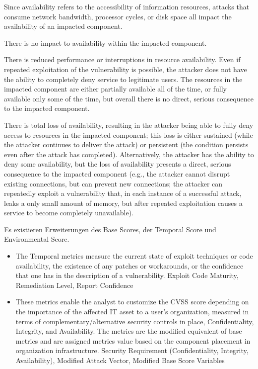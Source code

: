 \begin{description}[itemsep=1em,align=left]
            Since availability refers to the accessibility of information resources, attacks that consume network bandwidth, processor cycles, or disk space all impact the availability of an impacted component.
            \begin{description}[noitemsep,align=left]
                \item [None:] There is no impact to availability within the impacted component.
                \item [Low:] There is reduced performance or interruptions in resource availability. 
                    Even if repeated exploitation of the vulnerability is possible, the attacker does not have the ability to completely deny service to legitimate users. 
                    The resources in the impacted component are either partially available all of the time, or fully available only some of the time, but overall there is no direct, serious consequence to the impacted component.
                \item [High:] There is total loss of availability, resulting in the attacker being able to fully deny access to resources in the impacted component; this loss is either sustained (while the attacker continues to deliver the attack) or persistent (the condition persists even after the attack has completed). 
                    Alternatively, the attacker has the ability to deny some availability, but the loss of availability presents a direct, serious consequence to the impacted component (e.g., the attacker cannot disrupt existing connections, but can prevent new connections; the attacker can repeatedly exploit a vulnerability that, in each instance of a successful attack, leaks a only small amount of memory, but after repeated exploitation causes a service to become completely unavailable).
            \end{description}
    \end{description}
    
    Es existieren Erweiterungen des Base Scores, der Temporal Score und Environmental Score. 
    \begin{itemize}
        \item The Temporal metrics measure the current state of exploit techniques or code availability, the existence of any patches or workarounds, or the confidence that one has in the description of a vulnerability. 
            Exploit Code Maturity, Remediation Level, Report Confidence
        \item These metrics enable the analyst to customize the CVSS score depending on the importance of the affected IT asset to a user's organization, measured in terms of complementary/alternative security controls in place, Confidentiality, Integrity, and Availability. 
            The metrics are the modified equivalent of base metrics and are assigned metrics value based on the component placement in organization infrastructure. 
            Security Requirement (Confidentiality, Integrity, Availability), Modified Attack Vector, Modified Base Score Variables
    \end{itemize}